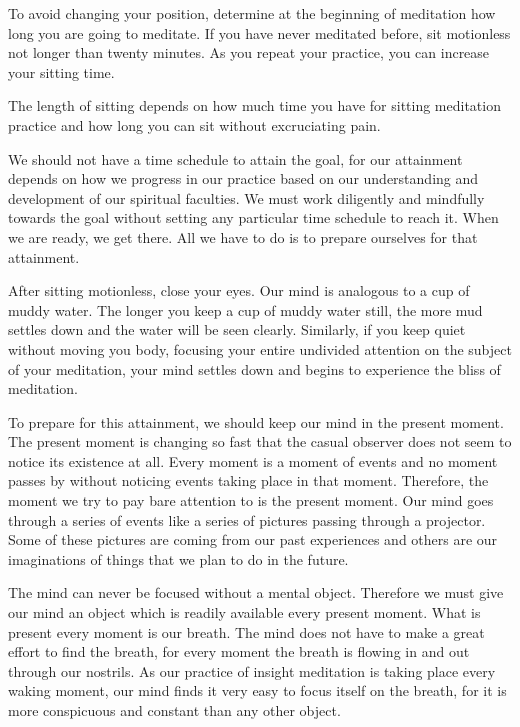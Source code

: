 To avoid changing your position, determine at the beginning of meditation how
long you are going to meditate. If you have never meditated before, sit
motionless not longer than twenty minutes. As you repeat your practice, you can
increase your sitting time.

The length of sitting depends on how much time you have for sitting meditation
practice and how long you can sit without excruciating pain.

We should not have a time schedule to attain the goal, for our attainment
depends on how we progress in our practice based on our understanding and
development of our spiritual faculties. We must work diligently and mindfully
towards the goal without setting any particular time schedule to reach it. When
we are ready, we get there. All we have to do is to prepare ourselves for that
attainment.

After sitting motionless, close your eyes. Our mind is analogous to a cup of
muddy water. The longer you keep a cup of muddy water still, the more mud
settles down and the water will be seen clearly. Similarly, if you keep quiet
without moving you body, focusing your entire undivided attention on the subject
of your meditation, your mind settles down and begins to experience the bliss of
meditation.

To prepare for this attainment, we should keep our mind in the present moment.
The present moment is changing so fast that the casual observer does not seem to
notice its existence at all. Every moment is a moment of events and no moment
passes by without noticing events taking place in that moment. Therefore, the
moment we try to pay bare attention to is the present moment. Our mind goes
through a series of events like a series of pictures passing through a
projector. Some of these pictures are coming from our past experiences and
others are our imaginations of things that we plan to do in the future.

The mind can never be focused without a mental object. Therefore we must give
our mind an object which is readily available every present moment. What is
present every moment is our breath. The mind does not have to make a great
effort to find the breath, for every moment the breath is flowing in and out
through our nostrils. As our practice of insight meditation is taking place
every waking moment, our mind finds it very easy to focus itself on the breath,
for it is more conspicuous and constant than any other object.

